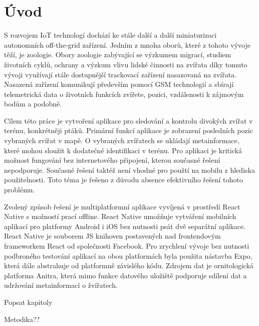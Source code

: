 \chapter*{Úvod}

S rozvojem IoT technologí dochází ke stále další a další miniaturizaci autonomních off-the-grid zařízení. Jedním z mnoha oborů, které z tohoto vývoje těží, je zoologie. Obory zoologie zabývající se výzkumem migrací, studiem životních cyklů, ochrany a výzkum vlivu lidské činnosti na zvířata díky tomuto vývoji využívají stále dostupnější trackovací zařízení nasazovaná na zvířata. Nasazená zařízení komunikují především pomocí GSM technologií a sbírají telemetrická data o životních funkcích zvířete, pozici, vzdálenosti k zájmovým bodům a podobně.


Cílem této práce je vytvoření aplikace pro sledování a kontrolu divokých zvířat v terénu, konkrétněji ptáků. Primární funkcí aplikace je zobrazení posledních pozic vybraných zvířat v mapě. O vybraných zvířatech se ukládají metainformace, které mohou sloužit k dodatečné identifikaci v terénu. Pro aplikaci je kritická možnost fungování bez internetového připojení, kterou současné řešení nepodporuje. Současné řešení taktéž není vhodné pro použtí na mobilu z hlediska použitelnosti. Toto téma je řešeno z důvodu absence efektivního řešení tohoto problému.

Zvolený způsob řešení je multiplatformní aplikace vyvíjená v prostředí React Native s možností prací offline. React Native umožňuje vytváření mobilních aplikací pro platformy Android i iOS bez nutnosti psát dvě separátní aplikace. React Native je souborem JS knihoven postavených nad frontendovým frameworkem React od společnosti Facebook. Pro zrychlení vývoje bez nutnosti podbroného testování aplikací na obou platformách byla použita nástavba Expo, která dále abstrahuje od platformně závislého kódu. Zdrojem dat je ornitologická platforma Anitra, která mimo funkce datového uložiště podporuje sdílení dat a udržování metainformací o žvířatech.

Popsat kapitoly

Metodika??